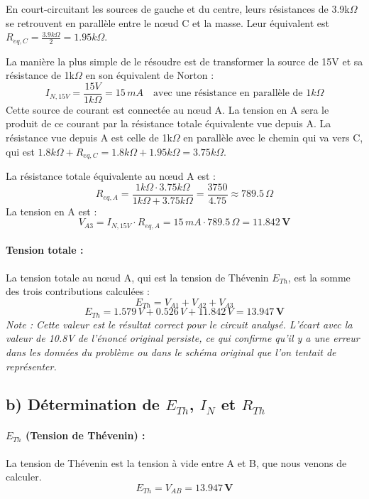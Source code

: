 \documentclass[12pt,a4paper]{article}
\begin{document}
En court-circuitant les sources de gauche et du centre, leurs résistances de 3.9k$\Omega$ se retrouvent en parallèle entre le nœud C et la masse. Leur équivalent est $R_{eq,C} = \frac{3.9k\Omega}{2} = 1.95k\Omega$.

La manière la plus simple de le résoudre est de transformer la source de 15V et sa résistance de 1k$\Omega$ en son équivalent de Norton :
$$ I_{N,15V} = \frac{15V}{1k\Omega} = 15 \, mA \quad \text{avec une résistance en parallèle de } 1k\Omega $$
Cette source de courant est connectée au nœud A. La tension en A sera le produit de ce courant par la résistance totale équivalente vue depuis A. La résistance vue depuis A est celle de 1k$\Omega$ en parallèle avec le chemin qui va vers C, qui est $1.8k\Omega + R_{eq,C} = 1.8k\Omega + 1.95k\Omega = 3.75k\Omega$.

La résistance totale équivalente au nœud A est :
$$ R_{eq,A} = \frac{1k\Omega \cdot 3.75k\Omega}{1k\Omega + 3.75k\Omega} = \frac{3750}{4.75} \approx 789.5 \, \Omega $$
La tension en A est :
$$ V_{A3} = I_{N,15V} \cdot R_{eq,A} = 15 \, mA \cdot 789.5 \, \Omega = \mathbf{11.842 \, V} $$

\paragraph{Tension totale :}
La tension totale au nœud A, qui est la tension de Thévenin $E_{Th}$, est la somme des trois contributions calculées :
$$ E_{Th} = V_{A1} + V_{A2} + V_{A3} $$
$$ E_{Th} = 1.579 \, V + 0.526 \, V + 11.842 \, V = \mathbf{13.947 \, V} $$
\textit{Note : Cette valeur est le résultat correct pour le circuit analysé. L'écart avec la valeur de 10.8V de l'énoncé original persiste, ce qui confirme qu'il y a une erreur dans les données du problème ou dans le schéma original que l'on tentait de représenter.}

\subsection*{b) Détermination de $E_{Th}$, $I_N$ et $R_{Th}$}
\paragraph{$E_{Th}$ (Tension de Thévenin) :}
La tension de Thévenin est la tension à vide entre A et B, que nous venons de calculer.
$$ E_{Th} = V_{AB} = \mathbf{13.947 \, V} $$
\end{document}
